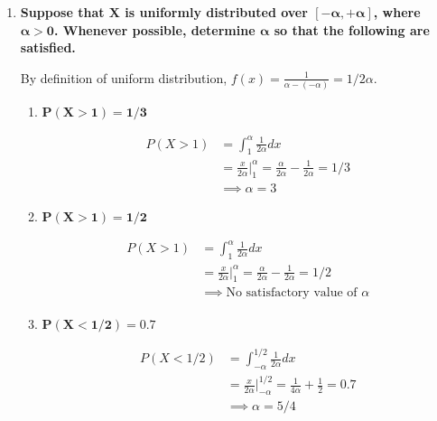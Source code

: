 \documentclass[10pt, oneside]{article}   	%
\theoremstyle{definition}
\begin{document}
\begin{enumerate}[label=4.\arabic*]
\item  \begin{tcolorbox}[
  colback=Cerulean!5!white,
  colframe=Cerulean!75!black]
\textbf{Suppose that $\bm{X}$ is uniformly distributed over $\bm{[-\alpha, +\alpha]}$, where $\bm{\alpha > 0}$. Whenever possible, determine $\bm{\alpha}$ so that the following are satisfied.}
\end{tcolorbox}

	By definition of uniform distribution, $f(x) = \frac{1}{\alpha - (-\alpha)} = 1/2\alpha$.

	\begin{enumerate}
	\item  \begin{tcolorbox}[
	  colback=Cerulean!5!white,
	  colframe=Cerulean!75!black]
	\textbf{$\bm{P(X > 1) = 1/3}$}
	\end{tcolorbox}
	
	\begin{align*}
	P(X > 1) &= \int^\alpha_1 \frac{1}{2\alpha} dx \\
	&= \frac{x}{2 \alpha} \Big|^\alpha_1 = \frac{\alpha}{2\alpha} - \frac{1}{2\alpha} = 1/3\\
	&\implies \boxed{\alpha = 3}
	\end{align*}
		
	\item  \begin{tcolorbox}[
	  colback=Cerulean!5!white,
	  colframe=Cerulean!75!black]
	\textbf{$\bm{P(X > 1) = 1/2}$}
	\end{tcolorbox}
	
	\begin{align*}
	P(X > 1) &= \int^\alpha_1 \frac{1}{2\alpha} dx \\
	&= \frac{x}{2 \alpha} \Big|^\alpha_1 = \frac{\alpha}{2\alpha} - \frac{1}{2\alpha} = 1/2\\
	&\implies \boxed{\text{No satisfactory value of }\alpha}
	\end{align*}
	
	\item  \begin{tcolorbox}[
	  colback=Cerulean!5!white,
	  colframe=Cerulean!75!black]
	\textbf{$\bm{P(X < 1/2) = 0.7}$}
	\end{tcolorbox}
	
	\begin{align*}
	P(X < 1/2) &= \int^{1/2}_{-\alpha} \frac{1}{2\alpha} dx \\
	&= \frac{x}{2\alpha} \Big|^{1/2}_{-\alpha} = \frac{1}{4\alpha} + \frac{1}{2} = 0.7 \\
	&\implies \boxed{\alpha = 5/4}
	\end{align*}
	

\end{enumerate}
\end{enumerate}
\end{document}
